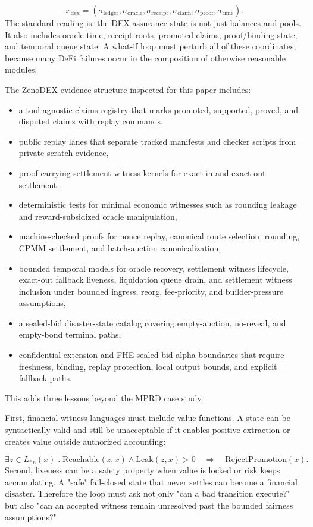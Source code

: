 \documentclass[11pt]{article}
\begin{document}
\[
x_{\mathrm{dex}} =
(\sigma_{\mathrm{ledger}},\sigma_{\mathrm{oracle}},
\sigma_{\mathrm{receipt}},\sigma_{\mathrm{claim}},
\sigma_{\mathrm{proof}},\sigma_{\mathrm{time}}).
\]
The standard reading is: the DEX assurance state is not just balances and pools. It also includes oracle time, receipt roots, promoted claims, proof/binding state, and temporal queue state. A what-if loop must perturb all of these coordinates, because many DeFi failures occur in the composition of otherwise reasonable modules.

The ZenoDEX evidence structure inspected for this paper includes:

\begin{itemize}
\item a tool-agnostic claims registry that marks promoted, supported, proved, and
disputed claims with replay commands,
\item public replay lanes that separate tracked manifests and checker scripts from
private scratch evidence,
\item proof-carrying settlement witness kernels for exact-in and exact-out
settlement,
\item deterministic tests for minimal economic witnesses such as rounding leakage
and reward-subsidized oracle manipulation,
\item machine-checked proofs for nonce replay, canonical route selection, rounding,
CPMM settlement, and batch-auction canonicalization,
\item bounded temporal models for oracle recovery, settlement witness lifecycle,
exact-out fallback liveness, liquidation queue drain, and settlement witness
inclusion under bounded ingress, reorg, fee-priority, and builder-pressure
assumptions,
\item a sealed-bid disaster-state catalog covering empty-auction, no-reveal, and
empty-bond terminal paths,
\item confidential extension and FHE sealed-bid alpha boundaries that require
freshness, binding, replay protection, local output bounds, and explicit
fallback paths.
\end{itemize}
This adds three lessons beyond the MPRD case study.

First, financial witness languages must include value functions. A state can be syntactically valid and still be unacceptable if it enables positive extraction or creates value outside authorized accounting:

\[
\exists z\in L_{\mathrm{fin}}(x)\;.\;
\mathrm{Reachable}(z,x)\wedge \mathrm{Leak}(z,x)>0
\quad\Rightarrow\quad
\mathrm{RejectPromotion}(x).
\]
Second, liveness can be a safety property when value is locked or risk keeps accumulating. A "safe" fail-closed state that never settles can become a financial disaster. Therefore the loop must ask not only "can a bad transition execute?" but also "can an accepted witness remain unresolved past the bounded fairness assumptions?"
\end{document}
